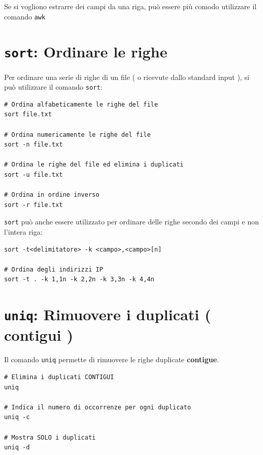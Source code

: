 \documentclass[a4paper]{report}
\newenvironment{info}{\begin{tcolorbox}[fonttitle=\sffamily\bfseries\large,title=Info,colframe=blue!75!white]}{\end{tcolorbox}}
\newenvironment{code}{\begin{tcolorbox}[size=small]}{\end{tcolorbox}}
\begin{document}
\begin{info}
	Se si vogliono estrarre dei campi da una riga, può essere più comodo utilizzare il comando \texttt{awk}
\end{info}

\section{\texttt{sort}: Ordinare le righe}

Per ordinare una serie di righe di un file ( o ricevute dallo standard input ), si può utilizzare il comando \texttt{sort}:

\begin{code}
\begin{lstlisting}
# Ordina alfabeticamente le righe del file
sort file.txt

# Ordina numericamente le righe del file
sort -n file.txt

# Ordina le righe del file ed elimina i duplicati
sort -u file.txt

# Ordina in ordine inverso
sort -r file.txt
\end{lstlisting}
\end{code}

\texttt{sort} può anche essere utilizzato per ordinare delle righe secondo dei campi e non l'intera riga:

\begin{code}
\begin{lstlisting}
sort -t<delimitatore> -k <campo>,<campo>[n]

# Ordina degli indirizzi IP
sort -t . -k 1,1n -k 2,2n -k 3,3n -k 4,4n
\end{lstlisting}
\end{code}

\section{\texttt{uniq}: Rimuovere i duplicati ( contigui )}

Il comando \texttt{uniq} permette di rimuovere le righe duplicate \textbf{contigue}. 

\begin{code}
	\begin{lstlisting}
# Elimina i duplicati CONTIGUI
uniq

# Indica il numero di occorrenze per ogni duplicato
uniq -c

# Mostra SOLO i duplicati
uniq -d
	\end{lstlisting}
\end{code}
\end{document}
